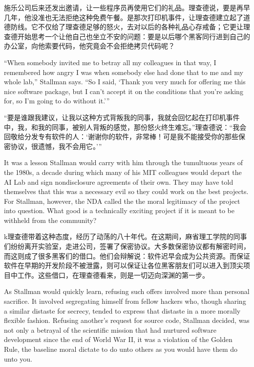 \ifdefined\chs
施乐公司后来还发出邀请，让一些程序员再使用它们的礼品。理查德说，要是再早几年，他没准也无法拒绝这种免费午餐。是那次打印机事件，让理查德建立起了道德防线。它不仅给了理查德足够的怒火，去对以后的各种礼品心存戒备；它更让理查德开始思考一个让他自己也坐立不安的问题：要是以后哪个黑客同行进到自己的办公室，向他索要代码，他究竟会不会拒绝拷贝代码呢？
\fi

\ifdefined\eng
``When somebody invited me to betray all my colleagues in that way, I remembered how angry I was when somebody else had done that to me and my whole lab,'' Stallman says. ``So I said, `Thank you very much for offering me this nice software package, but I can't accept it on the conditions that you're asking for, so I'm going to do without it.'\hspace{0.01in}''
\fi

\ifdefined\chs
“要是谁跟我建议，让我以这种方式背叛我的同事，我就会回忆起在打印机事件中，我，和我的同事，被别人背叛的感觉，那份怒火终生难忘。”理查德说：“我会回敬给分发专有软件的人：‘谢谢你的软件，非常棒！可是我不能接受你的那些保密协议，很遗憾，我不会用它。’”
\fi

\ifdefined\eng
It was a lesson Stallman would carry with him through the tumultuous years of the 1980s, a decade during which many of his MIT colleagues would depart the AI Lab and sign nondisclosure agreements of their own. They may have told themselves that this was a necessary evil so they could work on the best projects. For Stallman, however, the NDA called the the moral legitimacy of the project into question.  What good is a technically exciting project if it is meant to be withheld from the community? 
\fi

\ifdefined\chs
k理查德带着这种态度，经历了动荡的八十年代。在这期间，麻省理工学院的同事们纷纷离开实验室，走进公司，签署了保密协议。大多数保密协议都有解密时间，而这则成了很多黑客们的借口。他们会辩解说：软件迟早会成为公共资源。而保证软件在早期的开发阶段不被泄露，则可以保证让各位黑客朋友们可以进入到顶尖项目中工作。这些借口，在理查德看来，则是一切迈向深渊的第一步。
\fi

\ifdefined\eng
As Stallman would quickly learn, refusing such offers involved more than personal sacrifice. It involved segregating himself from fellow hackers who, though sharing a similar distaste for secrecy, tended to express that distaste in a more morally flexible fashion. Refusing another's request for source code, Stallman decided, was not only a betrayal of the scientific mission that had nurtured software development since the end of World War II, it was a violation of the Golden Rule, the baseline moral dictate to do unto others as you would have them do unto you.
\fi

